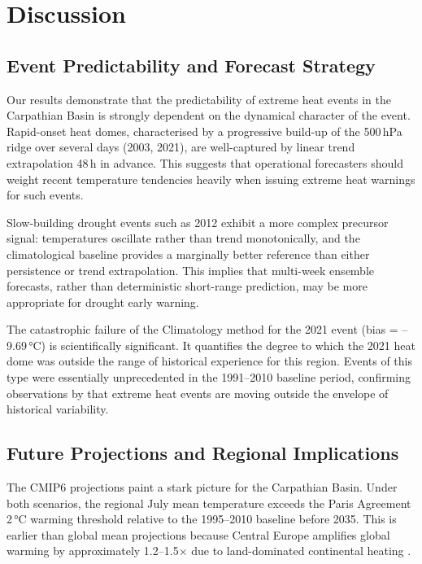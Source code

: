 \documentclass[12pt,a4paper]{article}
\begin{document}
\section{Discussion}
\label{sec:discussion}

\subsection{Event Predictability and Forecast Strategy}

Our results demonstrate that the predictability of extreme heat events
in the Carpathian Basin is strongly dependent on the dynamical character
of the event. Rapid-onset heat domes, characterised by a progressive
build-up of the 500\,hPa ridge over several days (2003, 2021), are
well-captured by linear trend extrapolation 48\,h in advance. This
suggests that operational forecasters should weight recent temperature
tendencies heavily when issuing extreme heat warnings for such events.

Slow-building drought events such as 2012 exhibit a more complex
precursor signal: temperatures oscillate rather than trend monotonically,
and the climatological baseline provides a marginally better reference
than either persistence or trend extrapolation. This implies that
multi-week ensemble forecasts, rather than deterministic short-range
prediction, may be more appropriate for drought early warning.

The catastrophic failure of the Climatology method for the 2021 event
(bias = --9.69\,°C) is scientifically significant. It quantifies the
degree to which the 2021 heat dome was outside the range of historical
experience for this region. Events of this type were essentially
unprecedented in the 1991--2010 baseline period, confirming observations
by \citet{ipcc2021} that extreme heat events are moving outside the
envelope of historical variability.

\subsection{Future Projections and Regional Implications}

The CMIP6 projections paint a stark picture for the Carpathian Basin.
Under both scenarios, the regional July mean temperature exceeds the
Paris Agreement 2\,°C warming threshold relative to the 1995--2010
baseline before 2035. This is earlier than global mean projections
because Central Europe amplifies global warming by approximately
1.2--1.5$\times$ due to land-dominated continental heating
\citep{seneviratne2021}.
\end{document}
